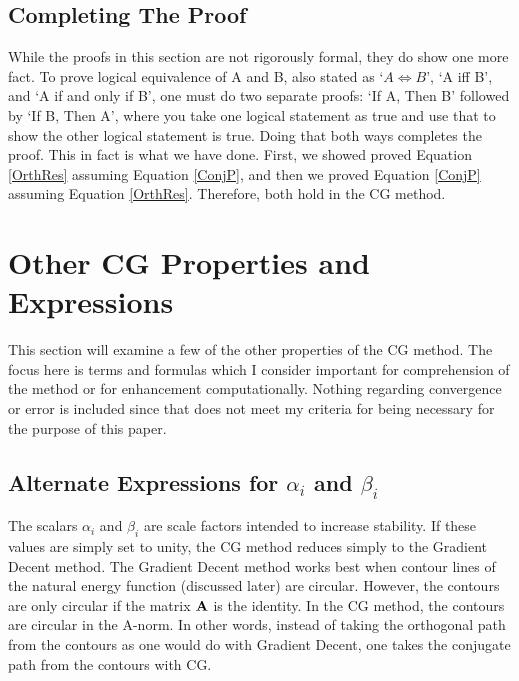\documentclass[11pt,letterpaper,oneside,notitlepage]{article}	%
\newcommand{\bfa}{{\bf A}}						%
\newcommand{\eq}[1]{Equation \eqref{#1}}		%
\newcommand{\pindent}[1]{\hspace{6mm}}  		%
\numberwithin{equation}{section}				%
\begin{document}
\subsection{Completing The Proof}
\pindent{}While the proofs in this section are not rigorously formal, they do show one more fact. To prove logical equivalence of A and B, also stated as `$A \Leftrightarrow B$', `A iff B', and `A if and only if B', one must do two separate proofs: `If A, Then B' followed by `If B, Then A', where you take one logical statement as true and use that to show the other logical statement is true. Doing that both ways completes the proof. This in fact is what we have done. First, we showed proved \eq{OrthRes} assuming \eq{ConjP}, and then we proved \eq{ConjP} assuming \eq{OrthRes}. Therefore, both hold in the CG method.


\section{Other CG Properties and Expressions}
\pindent{}This section will examine a few of the other properties of the CG method. The focus here is terms and formulas which I consider important for comprehension of the method or for enhancement computationally. Nothing regarding convergence or error is included since that does not meet my criteria for being necessary for the purpose of this paper.

\subsection{Alternate Expressions for $\alpha_i$ and $\beta_i$}%
\pindent{}The scalars $\alpha_i$ and $\beta_i$ are scale factors intended to increase stability. If these values are simply set to unity, the CG method reduces simply to the Gradient Decent method. The Gradient Decent method works best when contour lines of the natural energy function (discussed later) are circular. However, the contours are only circular if the matrix $\bfa$ is the identity. In the CG method, the contours are circular in the A-norm. In other words, instead of taking the orthogonal path from the contours as one would do with Gradient Decent, one takes the conjugate path from the contours with CG.
\end{document}

